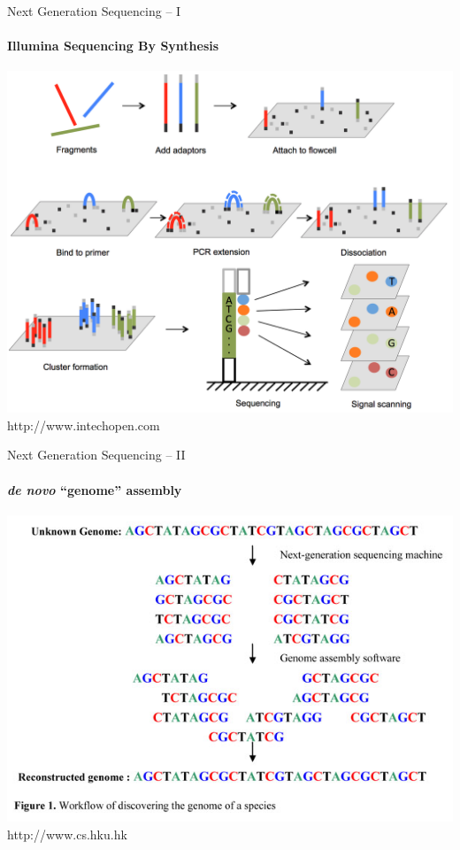\documentclass[letter,graphicx]{beamer}
\begin{document}
\begin{frame}{Next Generation Sequencing -- I}
\framesubtitle{Illumina Sequencing By Synthesis}
{\centering
\includegraphics[height=0.80\textheight]{mhap_figs/illumina_fig.png}
}\\
{\tiny http://www.intechopen.com}
\end{frame}







\begin{frame}{Next Generation Sequencing -- II}
\framesubtitle{{\em de novo} ``genome'' assembly}
{\centering
\includegraphics[height=0.75\textheight]{mhap_figs/assembly.png}
}\\
{\tiny http://www.cs.hku.hk}
\end{frame}
\end{document}
